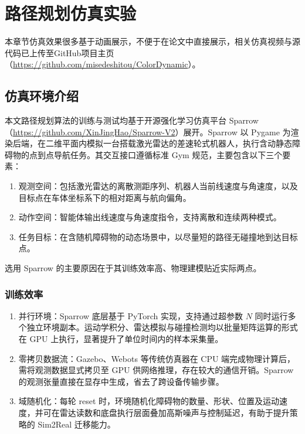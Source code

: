 \chapter{路径规划仿真实验}\label{chap:path_planning_simulation}
本章节仿真效果很多基于动画展示，不便于在论文中直接展示，相关仿真视频与源代码已上传至GitHub项目主页（\url{https://github.com/misedeshitou/ColorDynamic}）。

\section{仿真环境介绍}
本文路径规划算法的训练与测试均基于开源强化学习仿真平台 Sparrow（\url{https://github.com/XinJingHao/Sparrow-V2}）展开\cite{Color}。Sparrow 以 Pygame 为渲染后端，在二维平面内模拟一台搭载激光雷达的差速轮式机器人，执行含动静态障碍物的点到点导航任务。其交互接口遵循标准 Gym 规范，主要包含以下三个要素：

\begin{enumerate}
    \item 观测空间：包括激光雷达的离散测距序列、机器人当前线速度与角速度，以及目标点在车体坐标系下的相对距离与航向偏角。
    \item 动作空间：智能体输出线速度与角速度指令，支持离散和连续两种模式。
    \item 任务目标：在含随机障碍物的动态场景中，以尽量短的路径无碰撞地到达目标点。
\end{enumerate}

选用 Sparrow 的主要原因在于其训练效率高、物理建模贴近实际两点。

\subsection{训练效率}

\begin{enumerate}
\item 并行环境：Sparrow 底层基于 PyTorch 实现，支持通过超参数 $N$ 同时运行多个独立环境副本。运动学积分、雷达模拟与碰撞检测均以批量矩阵运算的形式在 GPU 上执行，显著提升了单位时间内的样本采集量。
\item 零拷贝数据流：Gazebo、Webots 等传统仿真器在 CPU 端完成物理计算后，需将观测数据显式拷贝至 GPU 供网络推理，存在较大的通信开销。Sparrow 的观测张量直接在显存中生成，省去了跨设备传输步骤。
\item 域随机化：每轮 reset 时，环境随机化障碍物的数量、形状、位置及运动速度，并可在雷达读数和底盘执行层面叠加高斯噪声与控制延迟，有助于提升策略的 Sim2Real 迁移能力。
\end{enumerate}

